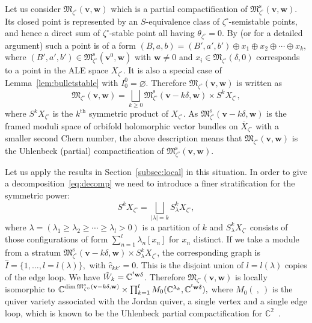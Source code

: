 \documentclass[pdftex]{sigma}
\theoremstyle{definition}
\numberwithin{equation}{section}
\newcommand{\lemref}[1]{Lemma~\ref{#1}}
\newcommand{\subsecref}[1]{Section~\ref{#1}}
\newcommand{\lsp}[2]{{\mskip-.3mu}{}^{#1}\mskip-1mu{#2}}
\newcommand{\C}{{\mathbb C}}
\newcommand{\M}{{\mathfrak M}} %
\newcommand{\Mreg}{\M^{\operatorname{s}}}
\newcommand{\bv}{{\mathbf v}} %
\newcommand{\bw}{{\mathbf w}} %
\begin{document}
Let us consider $\M_{\zeta^\circ}(\bv,\bw)$ which is a partial
compactif\/ication of $\Mreg_{\zeta^\circ}(\bv,\bw)$. Its closed point
is represented by an $S$-equivalence class of
$\zeta^\circ$-semistable points, and hence a direct sum of
$\zeta^\circ$-stable point all having $\theta_{\zeta^\circ} = 0$.
%
By \cite[Proposition~9.2(ii)]{KN} (or \cite[4.3]{Na-ADHM} for a detailed
argument) such a point is of a form
\(
    (B,a,b) = (B',a',b')\oplus x_1 \oplus x_2 \oplus \cdots \oplus x_k,
\)
where $(B',a',b')\in\Mreg_{\zeta^\circ}(\bv^0,\bw)$ with $\bw\neq 0$ and
$x_i\in\M_{\zeta^\circ}(\delta,0)$ corresponds to a point in the ALE
space $X_{\zeta^\circ}$.
%
It is also a special case of \lemref{lem:bulletstable} with $I_0^0 =
\varnothing$.
%
Therefore $\M_{\zeta^\circ}(\bv,\bw)$ is written as
\begin{equation}\label{eq:Uhzetacirc}
  \M_{\zeta^\circ}(\bv,\bw)
= \bigsqcup_{k\ge 0} \Mreg_{\zeta^\circ}(\bv-k\delta,\bw)
  \times S^k X_{\zeta^\circ},
\end{equation}
where $S^k X_{\zeta^\circ}$ is the $k^{\mathrm{th}}$ symmetric product
of $X_{\zeta^\circ}$.
%
As $\Mreg_{\zeta^\circ}(\bv-k\delta,\bw)$ is the framed moduli space
of orbifold holomorphic vector bundles on $\overline{X}_{\zeta^\circ}$
with a smaller second Chern number, the above description means that
$\M_{\zeta^\circ}(\bv,\bw)$ is the Uhlenbeck (partial)
compactif\/ication of $\Mreg_{\zeta^\circ}(\bv,\bw)$.

Let us apply the results in \subsecref{subsec:local} in this
situation. In order to give a decomposition~\eqref{eq:decomp} we need
to introduce a f\/iner stratif\/ication for the symmetric power:
\begin{equation*}
   S^k X_{\zeta^\circ} = \bigsqcup_{|\lambda| = k} S^k_\lambda X_{\zeta^\circ},
\end{equation*}
where $\lambda = (\lambda_1 \ge \lambda_2\ge \cdots\ge \lambda_l > 0)$
is a partition of $k$ and $S^k_\lambda X_{\zeta^\circ}$ consists of
those conf\/igurations of form $\sum_{n=1}^l \lambda_n [x_n]$ for
$x_n$ distinct. If we take a module from a stratum
$\Mreg_{\zeta^\circ}(\bv-k\delta,\bw) \times S^k_\lambda
X_{\zeta^\circ}$, the corresponding graph is
\(
   \widehat I = \{ 1,\dots, l = l(\lambda)\},
\)
with
\(
   \widehat c_{kk'} = 0.
\)
This is the disjoint union of $l = l(\lambda)$ copies of the edge loop.
%
We have $\Hat{W}_k = \C^{\lsp{t}{\bw} \delta}$. Therefore
$\M_{\zeta^\circ}(\bv,\bw)$ is locally isomorphic to
\(
   \C^{\dim \Mreg_{\zeta^\circ}(\bv-k\delta,\bw)}\times
   \prod_{k=1}^l M_0(\C^{\lambda_k}, \C^{\lsp{t}{\bw} \delta}),
\)
where $M_0(\ ,\ )$ is the quiver variety associated with the Jordan
quiver, a single vertex and a single edge loop, which is known to be
the Uhlenbeck partial compactif\/ication for $\C^2$~\cite{Lecture}.
\end{document}
